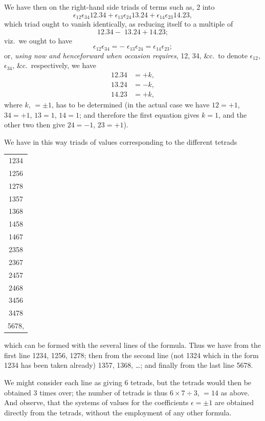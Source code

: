 \documentclass[11pt,a4paper]{book}
\begin{document}
We have then on the right-hand side triads of terms such as, 2 into
\[
\epsilon_{12}\epsilon_{34}12.34 + \epsilon_{13}\epsilon_{24}13.24 + \epsilon_{14}\epsilon_{23}14.23,
\]
which triad ought to vanish identically, as reducing itself to a multiple of
\[
12.34 - \; 13.24 + 14.23;
\]
viz.\ we ought to have
\[
\epsilon_{12}\epsilon_{34} = - \; \epsilon_{13}\epsilon_{24} = \epsilon_{14}\epsilon_{23};
\]
or, \textit{using now and henceforward when occasion requires}, 12, 34, \&c.\ to denote $\epsilon_{12}$, $\epsilon_{34}$, \&c.\ respectively, we have
\begin{align*}
12.34 &= +k, \\
13.24 &= -k, \\
14.23 &= +k,
\end{align*}
where $k$, $= \pm 1$, has to be determined (in the actual case we have $12 = +1$, $34 = +1$, $13 = 1$, $14 = 1$; and therefore the first equation gives $k = 1$, and the other two then give $24 = -1$, $23 = +1$).

We have in this way triads of values corresponding to the different tetrads
\begin{center}
\begin{tabular}{c}
1234 \\
1256 \\
1278 \\
1357 \\
1368 \\
1458 \\
1467 \\
2358 \\
2367 \\
2457 \\
2468 \\
3456 \\
3478 \\
5678,
\end{tabular}
\end{center}
which can be formed with the several lines of the formula. Thus we have from the first line 1234, 1256, 1278; then from the second line (not 1324 which in the form 1234 has been taken already) 1357, 1368, \ldots; and finally from the last line 5678.

\newpage
We might consider each line as giving 6 tetrads, but the tetrads would then be obtained 3 times over; the number of tetrads is thus $6 \times 7 \div 3$, $= 14$ as above. And observe, that the systems of values for the coefficients $\epsilon = \pm 1$ are obtained directly from the tetrads, without the employment of any other formula.
\end{document}
